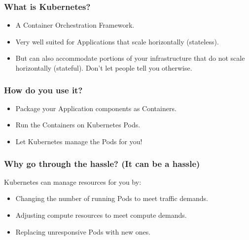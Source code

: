     \begin{frame}
        \frametitle{What is Kubernetes?}
        \begin{itemize}
            \item{A Container Orchestration Framework.}\pause
            \item{Very well suited for Applications that scale horizontally (stateless).}\pause
            \item{But can also accommodate portions of your infrastructure that do not scale horizontally (stateful). Don't let people tell you otherwise.}
        \end{itemize}
    \end{frame}

    \begin{frame}
        \frametitle{How do you use it?}
        \begin{itemize}
            \item{Package your Application components as Containers.}\pause
            \item{Run the Containers on Kubernetes Pods.}\pause
            \item{Let Kubernetes manage the Pods for you!}
        \end{itemize}
    \end{frame}

    \begin{frame}
        \frametitle{Why go through the hassle? (It can be a hassle)}
        Kubernetes can manage resources for you by:\pause
        \begin{itemize}
            \item{Changing the number of running Pods to meet traffic demands.}\pause
            \item{Adjusting compute resources to meet compute demands.}\pause
            \item{Replacing unresponsive Pods with new ones.}
        \end{itemize}
    \end{frame}

